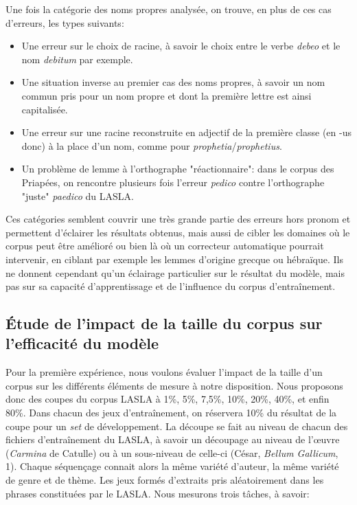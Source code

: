 Une fois la catégorie des noms propres analysée, on trouve, en plus de ces cas d'erreurs, les types suivants:
\begin{itemize}
    \item Une erreur sur le choix de racine, à savoir le choix entre le verbe \textit{debeo} et le nom \textit{debitum} par exemple.
    \item Une situation inverse au premier cas des noms propres, à savoir un nom commun pris pour un nom propre et dont la première lettre est ainsi capitalisée.
    \item Une erreur sur une racine reconstruite en adjectif de la première classe (en -us donc) à la place d'un nom, comme pour \textit{prophetia}/\textit{prophetius}.
    \item Un problème de lemme à l'orthographe "réactionnaire": dans le corpus des Priapées, on rencontre plusieurs fois l'erreur \textit{pedico} contre l'orthographe "juste" \textit{paedico} du LASLA.
\end{itemize}

Ces catégories semblent couvrir une très grande partie des erreurs hors pronom et permettent d'éclairer les résultats obtenus, mais aussi de cibler les domaines où le corpus peut être amélioré ou bien là où un correcteur automatique pourrait intervenir, en ciblant par exemple les lemmes d'origine grecque ou hébraïque. Ils ne donnent cependant qu'un éclairage particulier sur le résultat du modèle, mais pas sur sa capacité d'apprentissage et de l'influence du corpus d'entraînement.

\subsection{Étude de l'impact de la taille du corpus sur l'efficacité du modèle}
\label{lemmatisation:extensibilite:tailles}

Pour la première expérience, nous voulons évaluer l'impact de la taille d'un corpus sur les différents éléments de mesure à notre disposition. Nous proposons donc des coupes du corpus LASLA à 1\%, 5\%, 7,5\%, 10\%, 20\%, 40\%, et enfin 80\%. Dans chacun des jeux d'entraînement, on réservera 10\% du résultat de la coupe pour un \textit{set} de développement. La découpe se fait au niveau de chacun des fichiers d'entraînement du LASLA, à savoir un découpage au niveau de l'œuvre (\textit{Carmina} de Catulle) ou à un sous-niveau de celle-ci (César, \textit{Bellum Gallicum}, 1). Chaque séquençage connait alors la même variété d'auteur, la même variété de genre et de thème. Les jeux formés d'extraits pris aléatoirement dans les phrases constituées par le LASLA. Nous mesurons trois tâches, à savoir:

